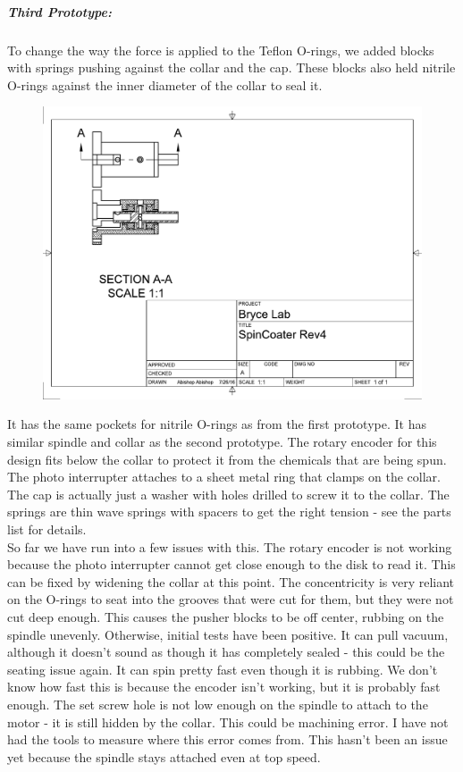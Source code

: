 \documentclass[12pt]{report}
\begin{document}
\subparagraph{Third Prototype:} To change the way the force is applied to the Teflon O-rings, we added blocks with springs pushing against the collar and the cap. These blocks also held nitrile O-rings against the inner diameter of the collar to seal it.
\begin{figure}[h]
\includegraphics{rev3}
\end{figure}
It has the same pockets for nitrile O-rings as from the first prototype. It has similar spindle and collar as the second prototype. The rotary encoder for this design fits below the collar to protect it from the chemicals that are being spun. The photo interrupter attaches to a sheet metal ring that clamps on the collar. The cap is actually just a washer with holes drilled to screw it to the collar.  The springs are thin wave springs with spacers to get the right tension - see the parts list for details. \\
So far we have run into a few issues with this. The rotary encoder is not working because the photo interrupter cannot get close enough to the disk to read it. This can be fixed by widening the collar at this point. The concentricity is very reliant on the O-rings to seat into the grooves that were cut for them, but they were not cut deep enough. This causes the pusher blocks to be off center, rubbing on the spindle unevenly. Otherwise, initial tests have been positive. It can pull vacuum, although it doesn't sound as though it has completely sealed - this could be the seating issue again. It can spin pretty fast even though it is rubbing. We don't know how fast this is because the encoder isn't working, but it is probably fast enough. The set screw hole is not low enough on the spindle to attach to the motor - it is still hidden by the collar. This could be machining error. I have not had the tools to measure where this error comes from. This hasn't been an issue yet because the spindle stays attached even at top speed.
\end{document}
